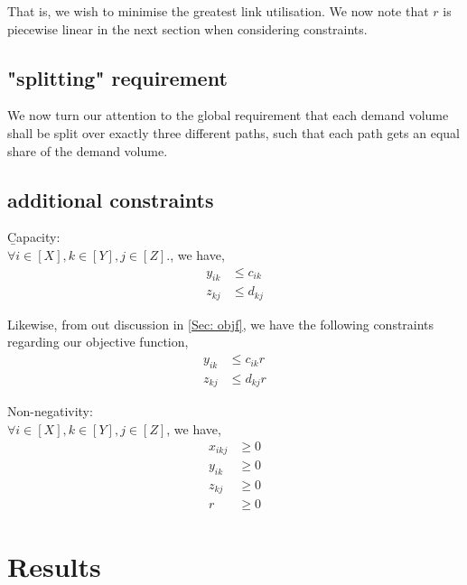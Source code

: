\documentclass[12pt,twoside]{article}
\begin{document}
That is, we wish to minimise the greatest link utilisation. We now note that $r$ is piecewise linear in the next section when considering constraints.

\subsection{"splitting" requirement}
We now turn our attention to the global requirement that each demand volume shall be split over exactly three different paths, such that each path gets an equal
share of the demand volume.

\subsection{additional constraints}
\b{Capacity}:\\
$\forall i \in [X], k \in [Y], j \in [Z]$., we have,
\begin{align*}
	y_{ik} &\leq c_{ik} \\
	z_{kj} &\leq d_{kj}  
\end{align*}

Likewise, from out discussion in \ref{Sec: objf}, we have the following constraints regarding our objective function,
\begin{align*}
	y_{ik} &\leq c_{ik} r\\
	z_{kj} &\leq d_{kj} r
\end{align*}

Non-negativity:\\
$\forall i \in [X], k \in [Y], j \in [Z]$, we have,
\begin{align*}
	x_{ikj} &\geq 0\\
	y_{ik} &\geq 0\\
	z_{kj} &\geq 0\\
	r &\geq 0
\end{align*}

\section{Results}











\end{document}
